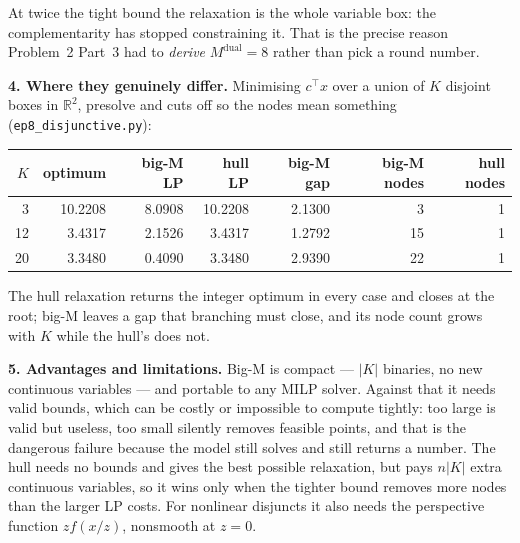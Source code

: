 \documentclass[10pt]{article}
\newcommand{\T}{^{\!\top}}
\begin{document}
At twice the tight bound the relaxation is the whole variable box: the
complementarity has stopped constraining it. That is the precise reason
Problem~2 Part~3 had to \emph{derive} $M^{\mathrm{dual}} = 8$ rather
than pick a round number.

\textbf{4. Where they genuinely differ.}
Minimising $c\T x$ over a union of $K$ disjoint boxes in
$\mathbb{R}^2$, presolve and cuts off so the nodes mean something
(\texttt{ep8\_disjunctive.py}):

\begin{center}\footnotesize
\setlength{\tabcolsep}{6pt}
\begin{tabular}{@{}rrrrrrr@{}}
\toprule
$K$ & optimum & big-M LP & hull LP & big-M gap
  & big-M nodes & hull nodes\\
\midrule
 3 & 10.2208 & 8.0908 & 10.2208 & 2.1300 &  3 & 1\\
12 &  3.4317 & 2.1526 &  3.4317 & 1.2792 & 15 & 1\\
20 &  3.3480 & 0.4090 &  3.3480 & 2.9390 & 22 & 1\\
\bottomrule
\end{tabular}
\end{center}

The hull relaxation returns the integer optimum in every case and
closes at the root; big-M leaves a gap that branching must close, and
its node count grows with $K$ while the hull's does not.

\textbf{5. Advantages and limitations.}
Big-M is compact --- $|K|$ binaries, no new continuous variables ---
and portable to any MILP solver. Against that it needs valid bounds,
which can be costly or impossible to compute tightly: too large is
valid but useless, too small silently removes feasible points, and
that is the dangerous failure because the model still solves and still
returns a number. The hull needs no bounds and gives the best possible
relaxation, but pays $n|K|$ extra continuous variables, so it wins
only when the tighter bound removes more nodes than the larger LP
costs. For nonlinear disjuncts it also needs the perspective function
$z f(x/z)$, nonsmooth at $z = 0$.
\end{document}
